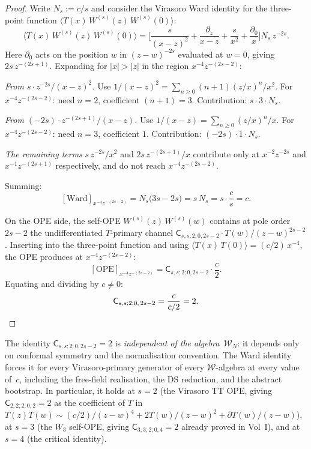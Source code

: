 \documentclass[11pt]{article}
\newcommand{\cW}{\mathcal{W}}
\begin{document}
\begin{proof}
Write $N_s:=c/s$ and consider the Virasoro Ward identity for the
three-point function $\langle T(x)\,W^{(s)}(z)\,W^{(s)}(0)\rangle$:
\begin{equation}\label{eq:ward-three-point}
\langle T(x)\,W^{(s)}(z)\,W^{(s)}(0)\rangle
=
\biggl[
\frac{s}{(x-z)^2}+\frac{\partial_z}{x-z}
+\frac{s}{x^2}+\frac{\partial_0}{x}
\biggr]
N_s\,z^{-2s}.
\end{equation}
Here $\partial_0$ acts on the position $w$ in $(z-w)^{-2s}$
evaluated at $w=0$, giving $2s\,z^{-(2s+1)}$.  Expanding for
$|x|>|z|$ in the region $x^{-4}z^{-(2s-2)}$:

\medskip
\noindent\emph{From $s\cdot z^{-2s}/(x-z)^2$.}\enspace
Use $1/(x-z)^2 = \sum_{n\ge 0}(n+1)(z/x)^n/x^2$.
For $x^{-4}z^{-(2s-2)}$: need $n=2$, coefficient $(n+1)=3$.
Contribution: $s\cdot 3\cdot N_s$.

\medskip
\noindent\emph{From $(-2s)\cdot z^{-(2s+1)}/(x-z)$.}\enspace
Use $1/(x-z) = \sum_{n\ge 0}(z/x)^n/x$.
For $x^{-4}z^{-(2s-2)}$: need $n=3$, coefficient $1$.
Contribution: $(-2s)\cdot 1\cdot N_s$.

\medskip
\noindent\emph{The remaining terms} $s\,z^{-2s}/x^2$ and
$2s\,z^{-(2s+1)}/x$ contribute only at $x^{-2}z^{-2s}$ and
$x^{-1}z^{-(2s+1)}$ respectively, and do not reach $x^{-4}z^{-(2s-2)}$.

\medskip
Summing:
\[
[\text{Ward}]_{x^{-4}z^{-(2s-2)}}
= N_s\bigl(3s - 2s\bigr)
= s\,N_s
= s\cdot \frac{c}{s}
= c.
\]

On the OPE side, the self-OPE $W^{(s)}(z)\,W^{(s)}(w)$ contains at
pole order $2s-2$ the undifferentiated $T$-primary channel
$\mathsf{C}_{s,s;2;0,2s-2}\cdot T(w)/(z-w)^{2s-2}$.  Inserting into
the three-point function and using
$\langle T(x)\,T(0)\rangle = (c/2)\,x^{-4}$, the OPE produces at
$x^{-4}z^{-(2s-2)}$:
\[
[\text{OPE}]_{x^{-4}z^{-(2s-2)}}
=
\mathsf{C}_{s,s;2;0,2s-2}\cdot \frac{c}{2}.
\]
Equating and dividing by $c\neq 0$:
\[
\mathsf{C}_{s,s;2;0,\,2s-2}
= \frac{c}{c/2}
= 2.
\qedhere
\]
\end{proof}

\begin{remark}[Universality]
The identity $\mathsf{C}_{s,s;2;0,2s-2}=2$ is \emph{independent of
the algebra}~$\cW_N$: it depends only on conformal symmetry and the
normalisation convention.  The Ward identity forces it for every
Virasoro-primary generator of every $\cW$-algebra at every value of~$c$,
including the free-field realisation, the DS reduction, and the abstract
bootstrap.  In particular, it holds at $s=2$ (the Virasoro TT OPE,
giving $\mathsf{C}_{2,2;2;0,2}=2$ as the coefficient of $T$ in
$T(z)T(w)\sim (c/2)/(z-w)^4 + 2T(w)/(z-w)^2 + \partial T(w)/(z-w)$),
at $s=3$ (the $W_3$ self-OPE, giving $\mathsf{C}_{3,3;2;0,4}=2$
already proved in Vol~I), and at $s=4$ (the critical identity).
\end{remark}
\end{document}
